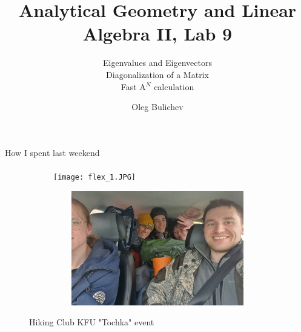 \documentclass[aspectratio=169]{beamer}
\title[AGLA2]{Analytical Geometry and Linear Algebra II, Lab 9} %
\subtitle{Eigenvalues and Eigenvectors \\ Diagonalization of a Matrix \\ Fast A$^N$ calculation
         } %
\author{Oleg Bulichev}
\newcommand{\fbckg}[1]{\usebackgroundtemplate{\texttt{[image: \#1]}}}%
\begin{document}
\setlength{\abovedisplayskip}{0pt}
\setlength{\belowdisplayskip}{0pt}
\setlength{\abovedisplayshortskip}{0pt}
\setlength{\belowdisplayshortskip}{0pt}

\fbckg{fibeamer/figs/title_page.png}

\fbckg{fibeamer/figs/common.png}

\begin{frame}[c]{How I spent last weekend}
    \framesubtitle{}
    \begin{figure}[H]
        \begin{subfigure}{0.49\textwidth}
            \centering\texttt{[image: flex\_1.JPG]}
        \end{subfigure}
        \hfill
        \begin{subfigure}{0.49\textwidth}
            \centering\includegraphics[height=5cm,width=1\textwidth,keepaspectratio]{flex_2.JPG}
        \end{subfigure}
        \caption*{\Large Hiking Club KFU "Tochka" event }
    \end{figure}
\end{frame}
\end{document}
